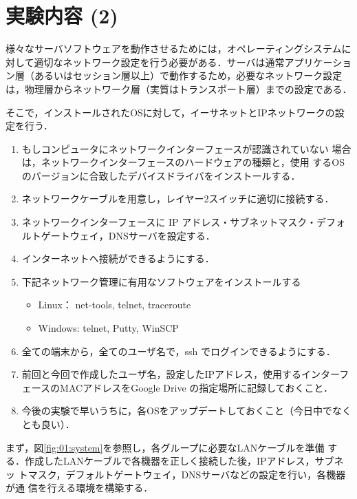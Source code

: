 \clearpage
\section{実験内容 (2)}

様々なサーバソフトウェアを動作させるためには，オペレーティングシステムに対して適切なネットワーク設定を行う必要がある．サーバは通常アプリケーション層（あるいはセッション層以上）で動作するため，必要なネットワーク設定は，物理層からネットワーク層（実質はトランスポート層）までの設定である．

そこで，インストールされたOSに対して，イーサネットとIPネットワークの設定を行う．
\begin{enumerate}
 \item もしコンピュータにネットワークインターフェースが認識されていない
       場合は，ネットワークインターフェースのハードウェアの種類と，使用
       するOSのバージョンに合致したデバイスドライバをインストールする．
 \item ネットワークケーブルを用意し，レイヤー2スイッチに適切に接続する．
 \item ネットワークインターフェースに IP アドレス・サブネットマスク・デフォ
       ルトゲートウェイ，DNSサーバを設定する．
 \item インターネットへ接続ができるようにする．
 \item 下記ネットワーク管理に有用なソフトウェアをインストールする
 \begin{itemize}
     \item Linux： net-tools, telnet, traceroute
     \item Windows: telnet, Putty, WinSCP
 \end{itemize}
 \item 全ての端末から，全てのユーザ名で，ssh でログインできるようにする．
 \item 前回と今回で作成したユーザ名，設定したIPアドレス，使用するインターフェースのMACアドレスをGoogle Drive の指定場所に記録しておくこと．
 \item 今後の実験で早いうちに，各OSをアップデートしておくこと（今日中でなくとも良い）．
\end{enumerate}

まず，図\ref{fig:01:system}を参照し，各グループに必要なLANケーブルを準備
する．作成したLANケーブルで各機器を正しく接続した後，IPアドレス，サブネッ
トマスク，デフォルトゲートウェイ，DNSサーバなどの設定を行い，各機器が通
信を行える環境を構築する．%

